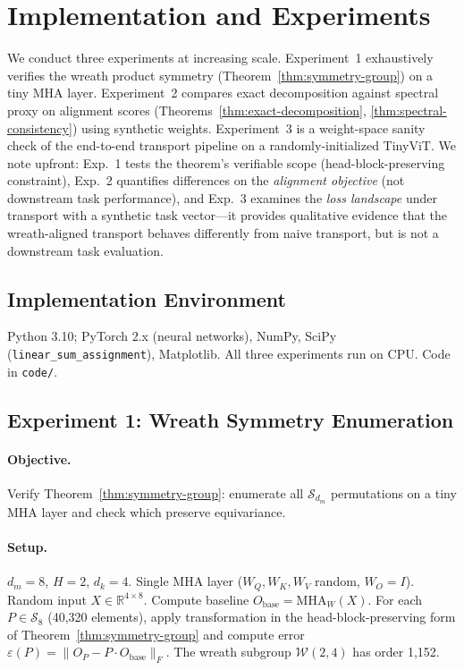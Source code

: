 \section{Implementation and Experiments}
\label{sec:experiments}

We conduct three experiments at increasing scale. Experiment~1 exhaustively verifies the wreath product symmetry (Theorem~\ref{thm:symmetry-group}) on a tiny MHA layer. Experiment~2 compares exact decomposition against spectral proxy on alignment scores (Theorems~\ref{thm:exact-decomposition}, \ref{thm:spectral-consistency}) using synthetic weights. Experiment~3 is a weight-space sanity check of the end-to-end transport pipeline on a randomly-initialized TinyViT. We note upfront: Exp.~1 tests the theorem's verifiable scope (head-block-preserving constraint), Exp.~2 quantifies differences on the \emph{alignment objective} (not downstream task performance), and Exp.~3 examines the \emph{loss landscape} under transport with a synthetic task vector---it provides qualitative evidence that the wreath-aligned transport behaves differently from naive transport, but is not a downstream task evaluation.

\subsection{Implementation Environment}
Python 3.10; PyTorch 2.x (neural networks), NumPy, SciPy (\texttt{linear\_sum\_assignment}), Matplotlib. All three experiments run on CPU. Code in \texttt{code/}.

\subsection{Experiment 1: Wreath Symmetry Enumeration}

\paragraph{Objective.} Verify Theorem~\ref{thm:symmetry-group}: enumerate all $\mathcal{S}_{d_m}$ permutations on a tiny MHA layer and check which preserve equivariance.

\paragraph{Setup.} $d_m = 8$, $H = 2$, $d_k = 4$. Single MHA layer ($W_Q, W_K, W_V$ random, $W_O = I$). Random input $X \in \mathbb{R}^{4 \times 8}$. Compute baseline $O_{\text{base}} = \text{MHA}_W(X)$. For each $P \in \mathcal{S}_8$ (40,320 elements), apply transformation in the head-block-preserving form of Theorem~\ref{thm:symmetry-group} and compute error $\varepsilon(P) = \|O_P - P \cdot O_{\text{base}}\|_F$. The wreath subgroup $\mathcal{W}(2,4)$ has order 1,152.

